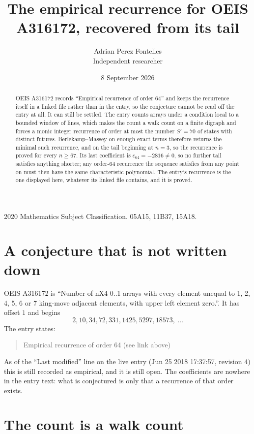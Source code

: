 \documentclass[11pt,a4paper]{article}
\title{The empirical recurrence for OEIS A316172, recovered from its tail}
\author{Adrian Perez Fontelles\\ \small Independent researcher}
\date{8 September 2026}
\theoremstyle{plain}
\theoremstyle{definition}
\begin{document}
\maketitle

\begin{abstract}
OEIS A316172 records ``Empirical recurrence of order $64$'' and keeps the recurrence itself in
a linked file rather than in the entry, so the conjecture cannot be read off the entry at all.
It can still be settled. The entry counts arrays under a condition local to a bounded window of
lines, which makes the count a walk count on a finite digraph and forces a monic integer
recurrence of order at most the number $S'=70$ of states with distinct futures. Berlekamp--Massey on
enough exact terms therefore returns the minimal such recurrence, and on the tail beginning at $n=3$, so the recurrence is proved for every $n\ge67$.
Its last coefficient is $c_{64}=-2816\neq0$, so no further tail satisfies anything
shorter; any order-$64$ recurrence the sequence satisfies from any point on must then have
the same characteristic polynomial. The entry's recurrence is the one displayed here, whatever
its linked file contains, and it is proved.
\end{abstract}

\noindent\small 2020 Mathematics Subject Classification. 05A15, 11B37, 15A18.\normalsize

\section{A conjecture that is not written down}

OEIS A316172 is ``Number of nX4 0..1 arrays with every element unequal to 1, 2, 4, 5, 6 or 7 king-move adjacent elements, with upper left element zero.''. It has offset $1$ and begins
\[
2, 10, 34, 72, 331, 1425, 5297, 18573,\ \dots
\]
The entry states:
\begin{quote}
Empirical recurrence of order 64 (see link above)
\end{quote}
As of the ``Last modified'' line on the live entry (Jun 25 2018 17:37:57, revision 4)
this is still recorded as empirical, and it is still open. The coefficients are nowhere in the
entry text: what is conjectured is only that a recurrence of that order exists.

\section{The count is a walk count}
\end{document}
